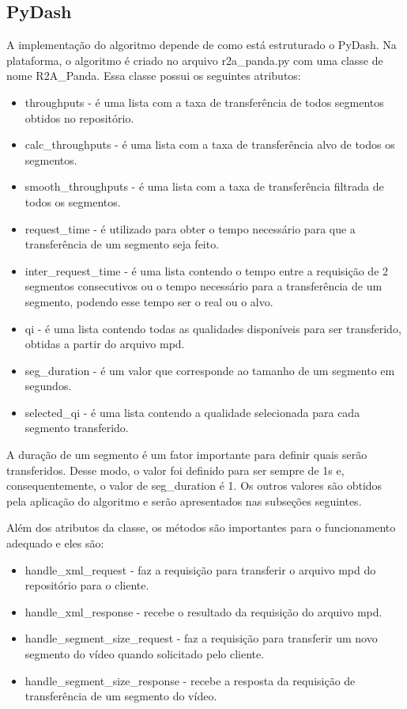 \documentclass[10pt,twocolumn,letterpaper]{article}
\begin{document}
	\subsection{PyDash}
	A implementação do algoritmo depende de como está estruturado o PyDash. Na plataforma, o algoritmo é criado no arquivo r2a\_panda.py com uma classe de nome R2A\_Panda. Essa classe possui os seguintes atributos:
	
	\begin{itemize}
		\item throughputs - é uma lista com a taxa de transferência de todos segmentos obtidos no repositório.
		\item calc\_throughputs - é uma lista com a taxa de transferência alvo de todos os segmentos.
		\item smooth\_throughputs - é uma lista com a taxa de transferência filtrada de todos os segmentos.
		\item request\_time - é utilizado para obter o tempo necessário para que a transferência de um segmento seja feito.
		\item inter\_request\_time - é uma lista contendo o tempo entre a requisição de 2 segmentos consecutivos ou o tempo necessário para a transferência de um segmento, podendo esse tempo ser o real ou o alvo.
		\item qi - é uma lista contendo todas as qualidades disponíveis para ser transferido, obtidas a partir do arquivo mpd.
		\item seg\_duration - é um valor que corresponde ao tamanho de um segmento em segundos.
		\item selected\_qi - é uma lista contendo a qualidade selecionada para cada segmento transferido.
	\end{itemize}
	
	A duração de um segmento é um fator importante para definir quais serão transferidos. Desse modo, o valor foi definido para ser sempre de 1s e, consequentemente, o valor de seg\_duration é 1. Os outros valores são obtidos pela aplicação do algoritmo e serão apresentados nas subseções seguintes.
	
	Além dos atributos da classe, os métodos são importantes para o funcionamento adequado e eles são:
	
	\begin{itemize}
		\item handle\_xml\_request - faz a requisição para transferir o arquivo mpd do repositório para o cliente.
		\item handle\_xml\_response - recebe o resultado da requisição do arquivo mpd.
		\item handle\_segment\_size\_request - faz a requisição para transferir um novo segmento do vídeo quando solicitado pelo cliente.
		\item handle\_segment\_size\_response - recebe a resposta da requisição de transferência de um segmento do vídeo.
	\end{itemize}
	
\end{document}
